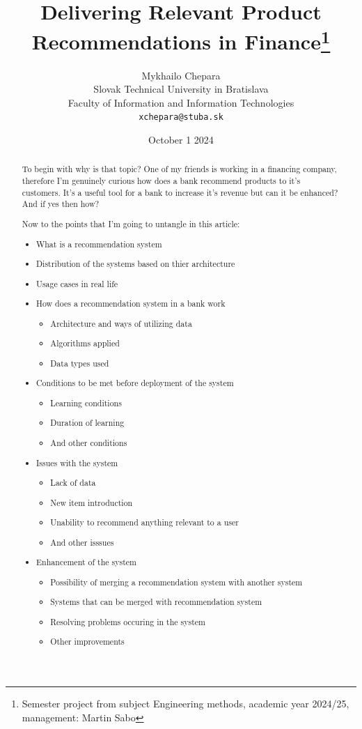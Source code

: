 \documentclass[10pt,twoside,english,a4paper]{article}
\title{Delivering Relevant Product Recommendations in Finance\thanks{Semester project from subject Engineering methods, academic year 2024/25, management: Martin Sabo}} %
\author{Mykhailo Chepara\\[2pt]
	{\small Slovak Technical University in Bratislava}\\
	{\small Faculty of Information and Information Technologies}\\
	{\small \texttt{xchepara@stuba.sk}}
	}
\date{\small October 1 2024} %
\begin{document}
\maketitle

\begin{abstract}
To begin with why is that topic? 
One of my friends is working in a financing company, therefore I'm genuinely curious how does a bank recommend products to it's customers. It's a useful tool for a bank to increase it's revenue but can it be enhanced? And if yes then how?

Now to the points that I'm going to untangle in this article:
\begin{itemize}
    \item What is a recommendation system
    \item Distribution of the systems based on thier architecture
    \item Usage cases in real life
    \item How does a recommendation system in a bank work
    \begin{itemize} 
             \item Architecture and ways of utilizing data
             \item Algorithms applied
             \item Data types used
    \end{itemize}
    
    \item Conditions to be met before deployment of the system
    \begin{itemize}
        \item Learning conditions
        \item Duration of learning
        \item And other conditions
    \end{itemize}
    
    \item Issues with the system
    \begin{itemize}
        \item Lack of data
        \item New item introduction
        \item Unability to recommend anything relevant to a user
        \item And other isssues
    \end{itemize}
    
    \item Enhancement of the system
    \begin{itemize}
        \item Possibility of merging a recommendation system with another system
        \item Systems that can be merged with recommendation system
        \item Resolving problems occuring in the system
        \item Other improvements
    \end{itemize}
    

\end{itemize}


\end{abstract}
\end{document}
